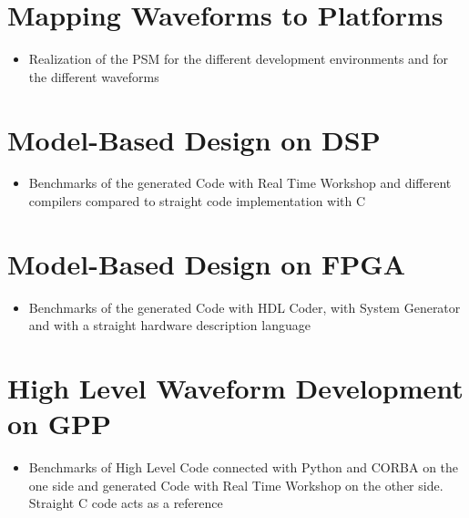\section{Mapping Waveforms to Platforms}
\begin{itemize}
	\item Realization of the PSM for the different development environments and for the different waveforms
\end{itemize}

\section{Model-Based Design on DSP}
\begin{itemize}
	\item Benchmarks of the generated Code with Real Time Workshop and different compilers compared to straight code implementation with C
\end{itemize}

\section{Model-Based Design on FPGA}
\begin{itemize}
	\item Benchmarks of the generated Code with HDL Coder, with System Generator and with a straight hardware description language 
\end{itemize}

\section{High Level Waveform Development on GPP}
\begin{itemize}
	\item Benchmarks of High Level Code connected with Python and CORBA on the one side and generated Code with Real Time Workshop on the other side. Straight C code acts as a reference
\end{itemize}
